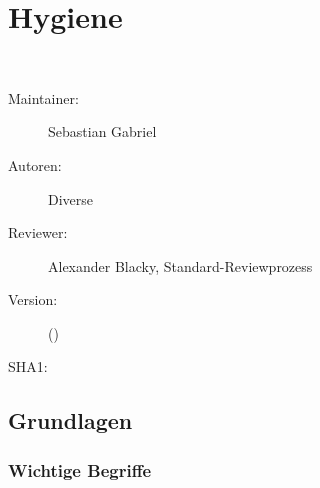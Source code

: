 % 
\def\ChapterCode{HYG}
\chapter
[\CO{[HYG]} Hygiene]
{Hygiene}
\label{chp:HYG}

\ChapterIntro
{%
~~
}
{%
\begin{description}
  \item[Maintainer:] Sebastian Gabriel
  \item[Autoren:] Diverse
  \item[Reviewer:] Alexander Blacky, Standard-Reviewprozess
  \item[Version:] {\DocVersion} ({\DocVersionInfo})
  \item[SHA1:] {\DocGitCommit}
\end{description}

{\TxTeilkapitelAASS}
}

\nocite{Longmore2007}
\nocite{IntroClinEmergMed4}
\nocite{Boecker2}
\nocite{Fauci2008}
\nocite{ForthPharma8}

% 

\clearpage %
\section{Grundlagen}

\subsection{Wichtige Begriffe}


